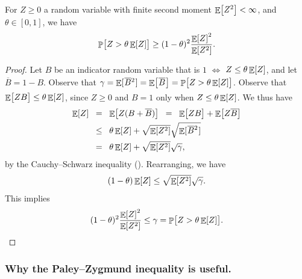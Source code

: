 \begin{theorem}
    For $Z \geq 0$ a random variable with finite second moment $\mathop{\mathbb{E}}\!\left[ {Z^2} \right] < \infty$, and
    $\theta \in [0,1]$, we have
    \begin{equation*}
        \Prob{Z > \theta \Ex{Z}\bigr.}
        \geq%
        (1-\theta)^2 \frac{\Ex{Z}^2}{\Ex{Z^2}}.
    \end{equation*}
\end{theorem}
\begin{proof}
    Let $B$ be an indicator random variable that is $1$ $\iff$
    $Z \leq \theta \mathop{\mathbb{E}}\!\left[ {Z} \right]$, and let $\overline{B} = 1- B$. Observe
    that
    $\gamma = \Ex{\ts\smash{\smash{\overline{B}}^2}\ts}\Bigr.=
    \Ex{\ts\smash{\overline{B}}\ts\bigr.} = \Prob{Z > \theta
       \Ex{Z}\bigr.}$.  Observe that
    $\mathop{\mathbb{E}}\!\left[ {Z B \bigr.} \right] \leq \theta \mathop{\mathbb{E}}\!\left[ {Z} \right]$, since $Z \geq 0$ and $B=1$ only when $Z \leq \theta \mathop{\mathbb{E}}\!\left[ {Z} \right]$.  We thus
    have
    \begin{align*}
        \Ex{Z}%
        &\EQ%
        \Ex{Z (B + \overline{B}) }
        \EQ%
        \Ex{Z B \bigr.} + \Ex{ \smash{Z \overline{B} } \bigr.}
        \\&%
        \LEQ
        \theta \Ex{Z} +
        \sqrt{\Ex{Z^2}} \sqrt{ \Ex{\ts\smash{\smash{\overline{B}}^2}\ts } \bigr. }
        \\&%
        \EQ%
        \theta \Ex{Z} +
        \sqrt{\Ex{Z^2}}  \sqrt{\gamma},
    \end{align*}
    by the Cauchy--Schwarz inequality ().
    Rearranging, we have
    \begin{equation*}
        (1-\theta)\mathop{\mathbb{E}}\!\left[ {Z} \right]
        \leq
        \sqrt{\mathop{\mathbb{E}}\!\left[ {Z^2} \right]}  \sqrt{\gamma}.
    \end{equation*}
    This implies
    \begin{align*}
      (1-\theta)^2\frac{\Ex{Z}^2}{\Ex{Z^2}}
      \leq
      \gamma
      =
      \Prob{Z > \theta
      \Ex{Z}\bigr.}.
    \end{align*}
\end{proof}

\subsubsection{Why the Paley--Zygmund inequality is useful.}

